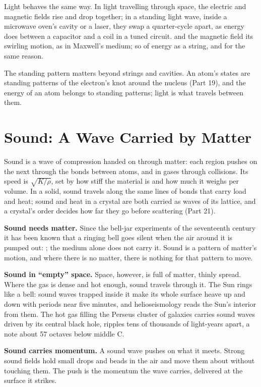 \documentclass[11pt,a4paper]{article}
\begin{document}
Light behaves the same way. In light travelling through space, the electric and magnetic fields rise and drop together; in a standing light wave, inside a microwave oven's cavity or a laser, they swap a quarter-cycle apart, as energy does between a capacitor and a coil in a tuned circuit.  and the magnetic field its swirling motion, as in Maxwell's medium; so  of energy as a string, and for the same reason.

The standing pattern matters beyond strings and cavities. An atom's states are standing patterns of the electron's knot around the nucleus (Part 19), and the energy of an atom belongs to standing patterns; light is what travels between them.

\section{Sound: A Wave Carried by Matter}

Sound is a wave of compression handed on through matter: each region pushes on the next through the bonds between atoms, and in gases through collisions. Its speed is $\sqrt{K/\rho}$, set by how stiff the material is and how much it weighs per volume. In a solid, sound travels along the same lines of bonds that carry load and heat; sound and heat in a crystal are both carried as waves of its lattice, and a crystal's order decides how far they go before scattering (Part 21).

\textbf{Sound needs matter.} Since the bell-jar experiments of the seventeenth century it has been known that a ringing bell goes silent when the air around it is pumped out: ; the medium alone does not carry it. Sound is a pattern of matter's motion, and where there is no matter, there is nothing for that pattern to move.

\textbf{Sound in ``empty'' space.} Space, however, is full of matter, thinly spread. Where the gas is dense and hot enough, sound travels through it. The Sun rings like a bell: sound waves trapped inside it make its whole surface heave up and down with periods near five minutes, and helioseismology reads the Sun's interior from them. The hot gas filling the Perseus cluster of galaxies carries sound waves driven by its central black hole, ripples tens of thousands of light-years apart, a note about 57 octaves below middle C.

\textbf{Sound carries momentum.} A sound wave pushes on what it meets. Strong sound fields hold small drops and beads in the air and move them about without touching them. The push is the momentum the wave carries, delivered at the surface it strikes.
\end{document}
